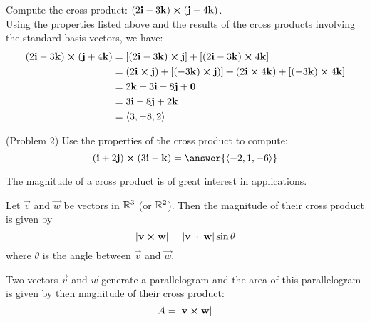 \documentclass[handout]{ximera}
\begin{document}
\begin{example}[Example 2]
Compute the cross product: $(2\mathbf{i} - 3\mathbf{k}) \boldsymbol\times (\mathbf{j} + 4\mathbf{k})$.\\
Using the properties listed above and the results of the cross products involving the standard basis vectors, we have:
\begin{align*}
(2\mathbf{i} - 3\mathbf{k}) \boldsymbol\times (\mathbf{j} + 4\mathbf{k}) & = [(2\mathbf{i} - 3\mathbf{k}) \boldsymbol\times \mathbf{j}] + [(2\mathbf{i} - 3\mathbf{k}) \boldsymbol\times   4\mathbf{k}]\\
                                  &= (2\mathbf{i} \boldsymbol\times \mathbf{j}) + [(-3\mathbf{k}) \boldsymbol\times \mathbf{j})] +(2\mathbf{i} \boldsymbol\times   4\mathbf{k}) + [ (- 3\mathbf{k}) \boldsymbol\times   4\mathbf{k}]\\
                                  &= 2\mathbf{k} + 3 \mathbf{i} -8\mathbf{j} + \mathbf{0}\\
                                  &= 3\mathbf{i} - 8\mathbf{j} +2\mathbf{k}\\
                                  &= \left\langle 3, -8, 2\right\rangle
\end{align*}
\end{example}

\begin{problem}(Problem 2)
Use the properties of the cross product to compute: 
\[
(\vec{i} + 2\vec{j}) \cross (3\vec{i} - \vec{k}) = \answer{\vector{-2,1,-6}}
\]
\end{problem}



The magnitude of a cross product is of great interest in applications.
\begin{proposition}
Let $\vec{v}$ and $\vec{w}$ be vectors in $\mathbb R^3$ (or $\mathbb R^2$). Then the magnitude of their cross product is given by
\[
|\mathbf{v} \boldsymbol\times \mathbf{w}| = |\mathbf{v}| \cdot |\mathbf{w}| \sin \theta
\]
where $\theta$ is the angle between $\vec{v}$ and $\vec{w}$.
\end{proposition}

Two vectors $\vec{v}$ and $\vec{w}$ generate a parallelogram and the area of this parallelogram is given by then magnitude of their cross product:
\[
A = |\mathbf{v} \boldsymbol\times \mathbf{w}|
\]

\begin{image}
\end{image}
\end{document}
